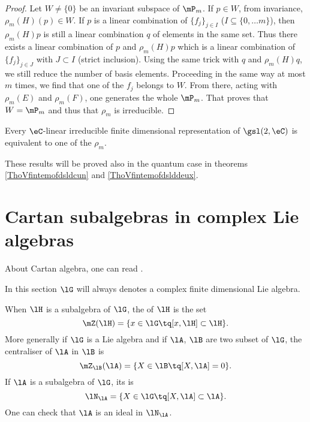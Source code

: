 \begin{proof}
Let $W\neq\{ 0 \}$ be an invariant subspace of $\mP_m$. If $p\in W$, from invariance, $\rho_m(H)(p)\in W$. If $p$ is a linear combination of $\{ f_j \}_{j\in I}$ ($I\subseteq \{ 0,\ldots m \}$), then $\rho_m(H)p$ is still a linear combination $q$ of elements in the same set. Thus there exists a linear combination of $p$ and $\rho_m(H)p$ which is a linear combination of $\{ f_j \}_{j\in J}$ with $J\subset I$ (strict inclusion). Using the same trick with $q$ and $\rho_m(H)q$, we still reduce the number of basis elements. Proceeding in the same way at most $m$ times, we find that one of the $f_j$ belongs to $W$. From there, acting with $\rho_m(E)$ and $\rho_m(F)$, one generates the whole $\mP_m$. That proves that $W=\mP_m$ and thus that $\rho_m$ is irreducible. 
\end{proof}

\begin{theorem}[\label{GpAlgLie_Faraut}]
Every $\eC$-linear irreducible finite dimensional representation of $\gsl(2,\eC)$ is equivalent to one of the $\rho_m$.
\end{theorem}

These results will be proved also in the quantum case in theorems \ref{ThoVfintemofdsldcun} and \ref{ThoVfintemofdslddeux}.

\section{Cartan subalgebras in complex Lie algebras}
\label{SecCartaninComplex}
About Cartan algebra, one can read \cite{Dragan,Berndt,Hochschild,SamelsonNotesLieAlg}.

In this section $\lG$ will always denotes a complex finite dimensional Lie algebra. 

\begin{definition}\label{PgDefCentralisateur}
    When \( \lH\) is a subalgebra of \( \lG\), the  of \( \lH\) is the set
    \begin{equation}
        \mZ(\lH)=\{x\in\lG\tq [x,\lH]\subset\lH\}.
    \end{equation}
    More generally if $\lG$ is a Lie algebra and if $\lA$, $\lB$ are two subset of $\lG$, the centraliser of $\lA$ in $\lB$ is
    \begin{equation}
        \mZ_{\lB}(\lA)=\{X\in\lB\tq [X,\lA]=0\}.
    \end{equation}
    If $\lA$ is a subalgebra of $\lG$, its  is 
    \begin{equation}
        \lN_{\lA}=\{X\in\lG\tq [X,\lA]\subset\lA\}.
    \end{equation}
    One can check that $\lA$ is an ideal in $\lN_{\lA}$.
\end{definition}

